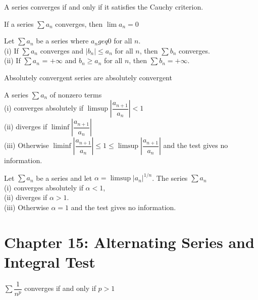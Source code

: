 \documentclass[10pt]{article}
\begin{document}
\begin{thm}
A series converges if and only if it satisfies the Cauchy criterion.
\end{thm}

\begin{cor}
If a series $\sum a_n$ converges, then $\lim a_n = 0$
\end{cor}

\begin{defn}
Let $\sum a_n$ be a series where $a_n geq 0$ for all $n$.\\
(i) If $\sum a_n$ converges and $|b_n| \leq a_n$ for all $n$, then $\sum b_n$ converges.\\
(ii) If $\sum a_n$ = $+ \infty$ and $b_n \geq a_n$ for all $n$, then $\sum b_n = +\infty$.
\end{defn}

\begin{cor}
Absolutely convergent series are absolutely convergent
\end{cor}

\begin{defn}
A series $\sum a_n$ of nonzero terms\\
(i) converges absolutely if $\limsup\left|\dfrac{a_{n+1}}{a_n}\right| < 1$\\
(ii) diverges if $\liminf\left|\dfrac{a_{n+1}}{a_n}\right|$\\
(iii) Otherwise $\liminf\left|\dfrac{a_{n+1}}{a_n}\right| \leq 1 \leq \limsup\left|\dfrac{a_{n+1}}{a_n}\right|$ and the test gives no information.
\end{defn}

\begin{defn}
Let $\sum a_n$ be a series and let $\alpha = \limsup |a_n|^{1/n}$. The series $\sum a_n$\\
(i) converges absolutely if $\alpha < 1$,\\
(ii) diverges if $\alpha >1$.\\
(iii) Otherwise $\alpha = 1$ and the test gives no information.
\end{defn}

\section*{Chapter 15: Alternating Series and Integral Test}
\begin{thm}
$\sum \dfrac{1}{n^p}$ converges if and only if $p > 1$
\end{thm}
\end{document}
